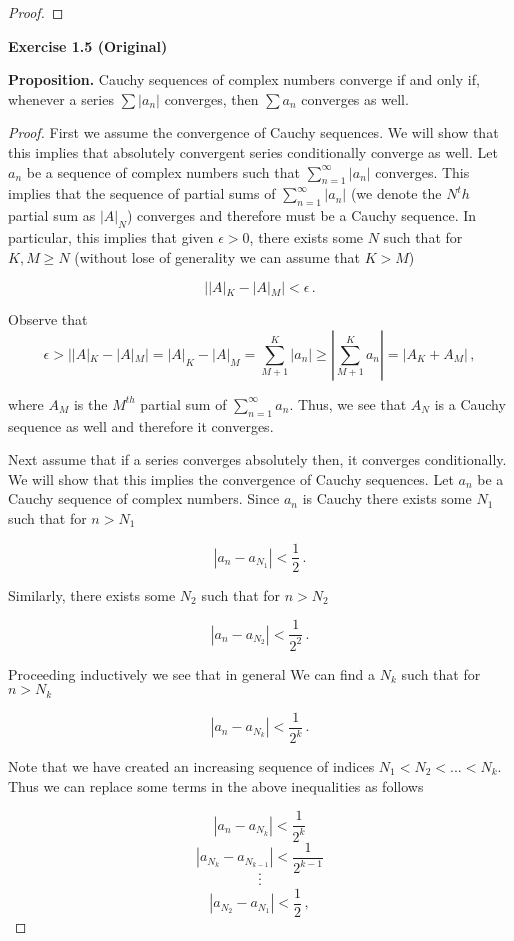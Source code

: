 \documentclass[a4paper]{article}
\newcommand {\m} {\cdot}
\numberwithin{equation}{section}
\begin{document}
\begin{description}
\begin{proof}
\end{proof}

\item \textbf{Exercise 1.5 (Original)} 

\textbf{Proposition.} Cauchy sequences of complex numbers converge if and only if, whenever a series $\sum |a_n|$ converges, then $\sum a_n$ converges as well.

\begin{proof} First we assume the convergence of Cauchy sequences. We will show that this implies that absolutely convergent series conditionally converge as well. Let ${a_n}$ be a sequence of complex numbers such that $\sum_{n=1}^\infty |a_n|$ converges. This implies that the sequence of partial sums of $\sum_{n=1}^\infty |a_n|$ (we denote the $N^th$ partial sum as $|A|_N$) converges and therefore must be a Cauchy sequence. In particular, this implies that given $\epsilon > 0$, there exists some $N$ such that for $K,M \geq N$ (without lose of generality we can assume that $K > M$) 

	$$||A|_K - |A|_M| < \epsilon\,.$$
	
	Observe that 
	$$\epsilon > ||A|_K - |A|_M| = |A|_K - |A|_M = \sum_{M+1}^K |a_n| \geq |\sum_{M+1}^K a_n| = |A_K +A_M|\,,$$
	
	where $A_M$ is the $M^{th}$ partial sum of $\sum_{n=1}^\infty a_n$. Thus, we see that ${A_N}$ is a Cauchy sequence as well and therefore it converges. 

Next assume that if a series converges absolutely then, it converges conditionally. We will show that this implies the convergence of Cauchy sequences. Let ${a_n}$ be a Cauchy sequence of complex numbers. Since ${a_n}$ is Cauchy there exists some $N_1$ such that for $n > N_1$

$$|a_n - a_{N_1}| < \frac{1}{2}\,.$$

Similarly, there exists some $N_2$ such that for $n > N_2$

$$|a_n - a_{N_2}| < \frac{1}{2^2}\,.$$

Proceeding inductively we see that in general We can find a $N_k$ such that for $n > N_k$

$$|a_n - a_{N_k}| < \frac{1}{2^k}\,.$$

Note that we have created an increasing sequence of indices $N_1 < N_2 < ... < N_k$. Thus we can replace some terms in the above inequalities as follows

	$$|a_n - a_{N_k}| < \frac{1}{2^k}$$
	$$|a_{N_k} - a_{N_{k-1}}| < \frac{1}{2^{k-1}}$$
	$$\m$$
	$$\m$$
	$$\m$$
	$$|a_{N_2} - a_{N_{1}}| < \frac{1}{2}\,,$$
	

\end{proof}
\end{description}
\end{document}
